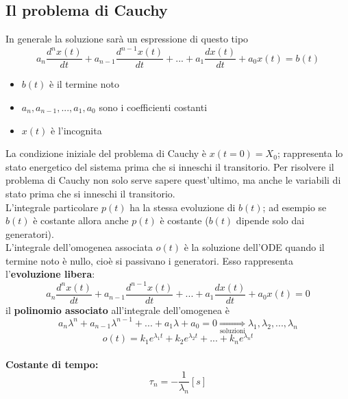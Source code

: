 \documentclass{article}
\begin{document}
\subsection{Il problema di Cauchy}
In generale la soluzione sarà un espressione di questo tipo
\[
    a_n \frac{d^n x(t)}{dt} + a_{n-1} \frac{d^{n-1} x(t)}{dt} + ... + a_1 \frac{d x(t)}{dt} + a_0 x(t) = b(t)
\]
\begin{itemize}
    \item $b(t)$ è il termine noto
    \item $a_n,a_{n-1},...,a_1,a_0$ sono i coefficienti costanti
    \item $x(t)$ è l'incognita
\end{itemize}
La condizione iniziale del problema di Cauchy è $x(t=0) = X_0$; rappresenta lo stato energetico del sistema prima che si inneschi il transitorio. Per risolvere il problema di Cauchy non solo serve sapere quest'ultimo, ma anche le variabili di stato prima che si inneschi il transitorio.
\vspace*{0.2cm}\\
L'integrale particolare $p(t)$ ha la stessa evoluzione di $b(t)$; ad esempio se $b(t)$ è costante allora anche $p(t)$ è costante ($b(t)$ dipende solo dai generatori).\\
L'integrale dell'omogenea associata $o(t)$ è la soluzione dell'ODE quando il termine noto è nullo, cioè si passivano i generatori. Esso rappresenta l'\textbf{evoluzione libera}:
\[
    a_n \frac{d^n x(t)}{dt} + a_{n-1} \frac{d^{n-1} x(t)}{dt} + ... + a_1 \frac{d x(t)}{dt} + a_0 x(t) = 0
\]
il \textbf{polinomio associato} all'integrale dell'omogenea è
\[
    a_n \lambda ^n + a_{n-1}\lambda ^{n-1} + ... + a_1\lambda + a_0 = 0 \underset{\text{soluzioni}}{\Longrightarrow} \lambda_1,\lambda_2,...,\lambda_n
\]
\[
    o(t) = k_1e^{\lambda_1t} + k_2e^{\lambda_2t} + ... + k_ne^{\lambda_nt} \tag*{$\lambda_1,\lambda_2,...,\lambda_n<0$}
\]
\vspace*{0.2cm}\\
\textbf{Costante di tempo:}
\[
    \tau_n = -\frac{1}{\lambda_n} [s]
\]
\end{document}
